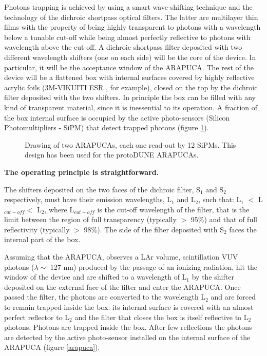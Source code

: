 Photons trapping is achieved by using a smart wave-shifting technique and the technology of the dichroic shortpass optical filters. The latter are multilayer thin films with the property of being highly transparent to photons with a wavelength below a tunable cut-off while being almost perfectly reflective to photons with wavelength above the cut-off. A dichroic shortpass filter deposited with two different wavelength shifters (one on each side) will be the core of the device. In particular, it will be the acceptance window of the ARAPUCA. The rest of the device will be a flattened box with internal surfaces covered by highly reflective acrylic foils (3M-VIKUITI ESR \cite{VIKUITI}, for example), closed on the top by the dichroic filter deposited with the two shifters. In principle the box can be filled with any kind of transparent material, since it is inessential to its operation. A fraction of the box internal surface is occupied by the active photo-sensors (Silicon Photomultipliers - SiPM) that detect trapped photons (figure \ref{arpk}).

\begin{figure}[ht]
\begin{center}
	\caption{Drawing of two ARAPUCAs, each one read-out by 12 SiPMs. This design has been used for the protoDUNE ARAPUCAs.} 
    \label{arpk}
\end{center}
\end{figure}

{\bf The operating principle is straightforward.}

The shifters deposited on the two faces of the dichroic filter, S$_1$ and S$_2$ respectively, must have their emission wavelengths, L$_1$ and L$_2$, such that: L$_1$ $<$ L$_{cut-off}$$ <$ L$_2$, where L$_{cut-off}$ is the cut-off wavelength of the filter, that is the limit between the region of full transparency (typically $>$ 95\%) and that of full reflectivity (typically $>$ 98\%). The side of the filter deposited with S$_2$ faces the internal part of the box.

Assuming that the ARAPUCA, observes a LAr volume, scintillation VUV photons ($\lambda \sim$ 127 nm) produced by the passage of an ionizing radiation, hit the window of the device and are shifted to a wavelength of L$_1$ by the shifter deposited on the external face of the filter and enter the ARAPUCA. Once passed the filter, the photons are converted to the wavelength L$_2$ and are forced to remain trapped inside the box: its internal surface is covered with an almost perfect reflector to L$_2$ and the filter that closes the box is itself reflective to L$_2$ photons. 
Photons are trapped inside the box. After few reflections the photons are detected by the active photo-sensor installed on the internal surface of the ARAPUCA (figure \ref{arapuca}). 

